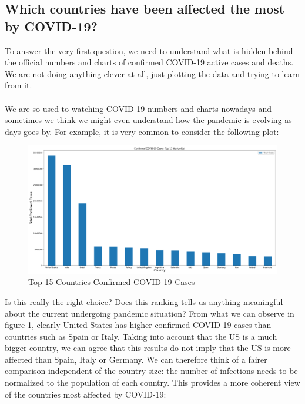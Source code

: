 \documentclass[11pt,a4paper]{article}
\begin{document}
\subsection{Which countries have been affected the most by COVID-19?}
To answer the very first question, we need to understand what is hidden behind
the official numbers and charts of confirmed COVID-19 active cases and deaths.
We are not doing anything clever at all, just plotting the data and trying to
learn from it.\\
\\
We are so used to watching COVID-19 numbers and charts nowadays and sometimes we
think we might even understand how the pandemic is evolving as days goes by. For
example, it is very common to consider the following plot:
\begin{figure}[H]
    \begin{center}
        \hspace*{-0.2cm}
        \includegraphics[scale=0.32]{img/total-cases.pdf}
    \end{center}
    \vspace{-0.3cm}
    \caption{Top 15 Countries Confirmed COVID-19 Cases}
\end{figure}
\noindent
Is this really the right choice? Does this ranking tells us anything meaningful
about the current undergoing pandemic situation? From what we can observe in
figure 1, clearly United States has higher confirmed COVID-19 cases than
countries such as Spain or Italy. Taking into account that the US is a much
bigger country, we can agree that this results do not imply that the US is more
affected than Spain, Italy or Germany. We can therefore think of a fairer
comparison independent of the country size: the number of infections needs to be
normalized to the population of each country. This provides a more coherent view
of the countries most affected by COVID-19:
\end{document}
